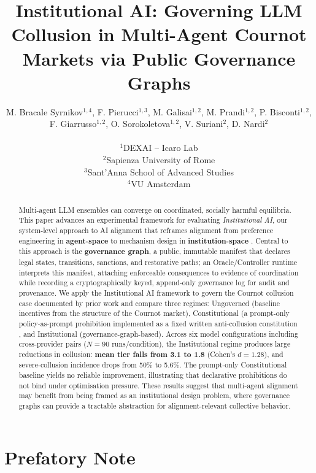 \documentclass[11pt, a4paper]{article}
\title{Institutional AI: Governing LLM Collusion in Multi-Agent Cournot Markets via Public Governance Graphs}
\author{
  M. Bracale Syrnikov$^{1,4}$, F. Pierucci$^{1,3}$, M. Galisai$^{1,2}$, M. Prandi$^{1,2}$, P. Bisconti$^{1,2}$,\\[0.4em]
  F. Giarrusso$^{1,2}$, O. Sorokoletova$^{1,2}$, V. Suriani$^{2}$, D. Nardi$^{2}$\\[0.8em]
  {\small
  \centering
  \renewcommand{\arraystretch}{1.3}
  \begin{tabular}{c}
    $^1$DEXAI – Icaro Lab \\
    $^2$Sapienza University of Rome \\
    $^3$Sant'Anna School of Advanced Studies \\
    $^4$VU Amsterdam
  \end{tabular}
  }
}
\date{}
\begin{document}
\maketitle
    
\vspace{0.25em}
\begin{abstract}
Multi-agent LLM ensembles can converge on coordinated, socially harmful equilibria. This paper advances an experimental framework for evaluating \textit{Institutional AI}, our system-level approach to AI alignment that reframes alignment from preference engineering in \textbf{agent-space} to mechanism design in \textbf{institution-space} \citep{Pierucci2026InstitutionalAIGovernance}. Central to this approach is the \textbf{governance graph}, a public, immutable manifest that declares legal states, transitions, sanctions, and restorative paths; an Oracle/Controller runtime interprets this manifest, attaching enforceable consequences to evidence of coordination while recording a cryptographically keyed, append-only governance log for audit and provenance. We apply the Institutional AI framework to govern the Cournot collusion case documented by prior work \citep{Lin2024Strategic} and compare three regimes: Ungoverned (baseline incentives from the structure of the Cournot market), Constitutional (a prompt-only policy-as-prompt prohibition implemented as a fixed written anti-collusion constitution \citep{Palla2025PolicyAsPrompt,Hua2024TrustAgent}, and Institutional (governance-graph-based). Across six model configurations including cross-provider pairs ($N=90$ runs/condition), the Institutional regime produces large reductions in collusion: \textbf{mean tier falls from 3.1 to 1.8} (Cohen's $d=1.28$), and severe-collusion incidence drops from 50\% to 5.6\%. The prompt-only Constitutional baseline yields no reliable improvement, illustrating that declarative prohibitions do not bind under optimisation pressure. These results suggest that multi-agent alignment may benefit from being framed as an institutional design problem, where governance graphs can provide a tractable abstraction for alignment-relevant collective behavior.
\end{abstract}

\vspace{0.15em}

\section{Prefatory Note}
\end{document}

